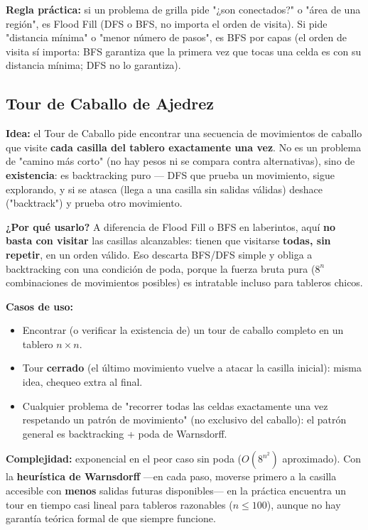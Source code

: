 \documentclass[10pt,a4paper,twocolumn]{article}
\begin{document}
\textbf{Regla práctica:} si un problema de grilla pide "¿son
conectados?" o "área de una región", es Flood Fill (DFS o BFS, no
importa el orden de visita). Si pide "distancia mínima" o "menor
número de pasos", es BFS por capas (el orden de visita sí importa:
BFS garantiza que la primera vez que tocas una celda es con su
distancia mínima; DFS no lo garantiza).

\subsection{Tour de Caballo de Ajedrez}

\textbf{Idea:} el Tour de Caballo pide encontrar una secuencia de
movimientos de caballo que visite \textbf{cada casilla del tablero
	exactamente una vez}. No es un problema de "camino más corto" (no
hay pesos ni se compara contra alternativas), sino de
\textbf{existencia}: es backtracking puro — DFS que prueba un
movimiento, sigue explorando, y si se atasca (llega a una casilla sin
salidas válidas) deshace ("backtrack") y prueba otro movimiento.

\textbf{¿Por qué usarlo?} A diferencia de Flood Fill o BFS en
laberintos, aquí \textbf{no basta con visitar} las casillas
alcanzables: tienen que visitarse \textbf{todas, sin repetir}, en
un orden válido. Eso descarta BFS/DFS simple y obliga a backtracking
con una condición de poda, porque la fuerza bruta pura ($8^{n}$
combinaciones de movimientos posibles) es intratable incluso para
tableros chicos.

\textbf{Casos de uso:}

\begin{itemize}
	\item Encontrar (o verificar la existencia de) un tour de caballo
	completo en un tablero $n \times n$.
	\item Tour \textbf{cerrado} (el último movimiento vuelve a
	atacar la casilla inicial): misma idea, chequeo extra al final.
	\item Cualquier problema de "recorrer todas las celdas exactamente
	una vez respetando un patrón de movimiento" (no exclusivo del
	caballo): el patrón general es backtracking + poda de
	Warnsdorff.
\end{itemize}

\textbf{Complejidad:} exponencial en el peor caso sin poda
($O(8^{n^2})$ aproximado). Con la \textbf{heurística de Warnsdorff}
—en cada paso, moverse primero a la casilla accesible con
\textbf{menos} salidas futuras disponibles— en la práctica encuentra
un tour en tiempo casi lineal para tableros razonables ($n \le 100$),
aunque no hay garantía teórica formal de que siempre funcione.
\end{document}
